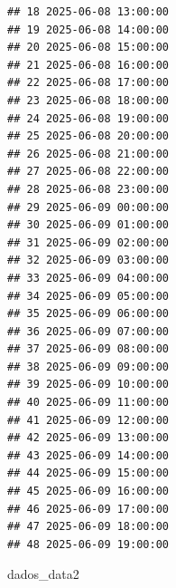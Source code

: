 \documentclass[
]{article}
\newenvironment{Shaded}{\begin{snugshade}}{\end{snugshade}}
\newcommand{\NormalTok}[1]{#1}
\begin{document}
\begin{verbatim}
## 18 2025-06-08 13:00:00
## 19 2025-06-08 14:00:00
## 20 2025-06-08 15:00:00
## 21 2025-06-08 16:00:00
## 22 2025-06-08 17:00:00
## 23 2025-06-08 18:00:00
## 24 2025-06-08 19:00:00
## 25 2025-06-08 20:00:00
## 26 2025-06-08 21:00:00
## 27 2025-06-08 22:00:00
## 28 2025-06-08 23:00:00
## 29 2025-06-09 00:00:00
## 30 2025-06-09 01:00:00
## 31 2025-06-09 02:00:00
## 32 2025-06-09 03:00:00
## 33 2025-06-09 04:00:00
## 34 2025-06-09 05:00:00
## 35 2025-06-09 06:00:00
## 36 2025-06-09 07:00:00
## 37 2025-06-09 08:00:00
## 38 2025-06-09 09:00:00
## 39 2025-06-09 10:00:00
## 40 2025-06-09 11:00:00
## 41 2025-06-09 12:00:00
## 42 2025-06-09 13:00:00
## 43 2025-06-09 14:00:00
## 44 2025-06-09 15:00:00
## 45 2025-06-09 16:00:00
## 46 2025-06-09 17:00:00
## 47 2025-06-09 18:00:00
## 48 2025-06-09 19:00:00
\end{verbatim}

\begin{Shaded}
\begin{Highlighting}[]
\NormalTok{dados\_data2}
\end{Highlighting}
\end{Shaded}
\end{document}
